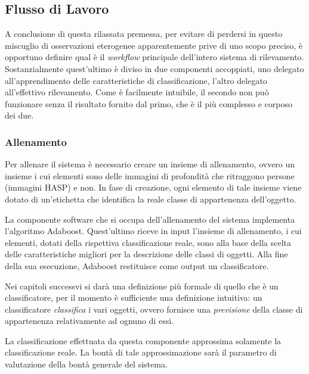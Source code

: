        \subsection{Flusso di Lavoro}
        \label{sub:overall_workflow}
            A conclusione di questa rilassata premessa, per evitare di perdersi in questo miscuglio di osservazioni eterogenee apparentemente prive di uno scopo preciso, è opportuno definire qual è il \emph{workflow} principale dell'intero sistema di rilevamento.
            Sostanzialmente quest'ultimo è diviso in due componenti accoppiati, uno delegato all'apprendimento delle caratteristiche di classificazione, l'altro delegato all'effettivo rilevamento.
            Come è facilmente intuibile, il secondo non può funzionare senza il risultato fornito dal primo, che è il più complesso e corposo dei due.

            \subsubsection{Allenamento}
                Per allenare il sistema è necessario creare un insieme di allenamento, ovvero un insieme i cui elementi sono delle immagini di profondità che ritraggono persone (immagini HASP) e non.
                In fase di creazione, ogni elemento di tale insieme viene dotato di un'etichetta che identifica la reale classe di appartenenza dell'oggetto.

                La componente software che si occupa dell'allenamento del sistema implementa l'algoritmo Adaboost.
                Quest'ultimo riceve in input l'insieme di allenamento, i cui elementi, dotati della rispettiva classificazione reale, sono alla base della scelta delle caratteristiche migliori per la descrizione delle classi di oggetti.
                Alla fine della sua esecuzione, Adaboost restituisce come output un classificatore.

                Nei capitoli successvi si darà una definizione più formale di quello che è un classificatore, per il momento è sufficiente una definizione intuitiva: un classificatore \emph{classifica} i vari oggetti, ovvero fornisce una \emph{previsione} della classe di appartenenza relativamente ad ognuno di essi.

                La classificazione effettuata da questa componente approssima solamente la classificazione reale. 
                La bontà di tale approssimazione sarà il parametro di valutazione della bontà generale del sistema.

